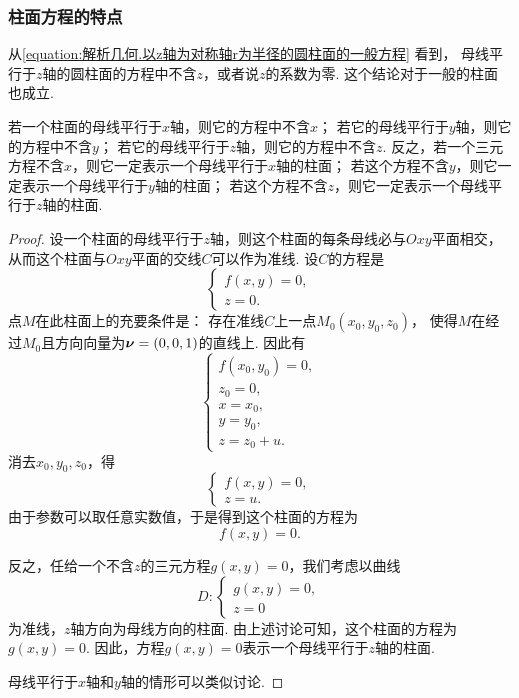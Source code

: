 \subsubsection{柱面方程的特点}
从\cref{equation:解析几何.以z轴为对称轴r为半径的圆柱面的一般方程} 看到，
母线平行于\(z\)轴的圆柱面的方程中不含\(z\)，或者说\(z\)的系数为零.
这个结论对于一般的柱面也成立.
\begin{theorem}
若一个柱面的母线平行于\(x\)轴，则它的方程中不含\(x\)；
若它的母线平行于\(y\)轴，则它的方程中不含\(y\)；
若它的母线平行于\(z\)轴，则它的方程中不含\(z\).
反之，若一个三元方程不含\(x\)，则它一定表示一个母线平行于\(x\)轴的柱面；
若这个方程不含\(y\)，则它一定表示一个母线平行于\(y\)轴的柱面；
若这个方程不含\(z\)，则它一定表示一个母线平行于\(z\)轴的柱面.
\begin{proof}
设一个柱面的母线平行于\(z\)轴，则这个柱面的每条母线必与\(Oxy\)平面相交，
从而这个柱面与\(Oxy\)平面的交线\(C\)可以作为准线.
设\(C\)的方程是\[
	\left\{ \begin{array}{l}
		f(x,y) = 0, \\
		z = 0.
	\end{array} \right.
\]
点\(M\)在此柱面上的充要条件是：
存在准线\(C\)上一点\(M_0(x_0,y_0,z_0)\)，
使得\(M\)在经过\(M_0\)且方向向量为\(\boldsymbol{\nu}=(0,0,1)\)的直线上.
因此有\[
	\left\{ \begin{array}{l}
		f(x_0,y_0) = 0, \\
		z_0 = 0, \\
		x = x_0, \\
		y = y_0, \\
		z = z_0 + u.
	\end{array} \right.
\]
消去\(x_0,y_0,z_0\)，得\[
	\left\{ \begin{array}{l}
		f(x,y) = 0, \\
		z = u.
	\end{array} \right.
\]
由于参数可以取任意实数值，于是得到这个柱面的方程为\[
	f(x,y) = 0.
\]

反之，任给一个不含\(z\)的三元方程\(g(x,y)=0\)，我们考虑以曲线\[
	D: \left\{ \begin{array}{l}
		g(x,y) = 0, \\
		z = 0
	\end{array} \right.
\]
为准线，\(z\)轴方向为母线方向的柱面.
由上述讨论可知，这个柱面的方程为\(g(x,y)=0\).
因此，方程\(g(x,y)=0\)表示一个母线平行于\(z\)轴的柱面.

母线平行于\(x\)轴和\(y\)轴的情形可以类似讨论.
\end{proof}
\end{theorem}


